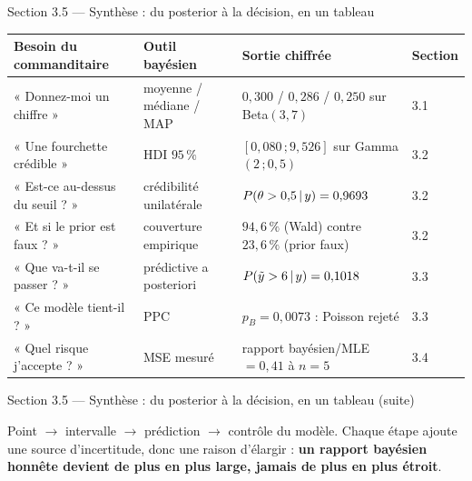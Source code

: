 \begin{frame}{Section 3.5 --- Synthèse : du posterior à la décision, en un tableau}
\begin{center}
\small
\begin{tabular}{@{}p{3.3cm}p{3.4cm}p{4.4cm}p{3.2cm}@{}}
\toprule
\textbf{Besoin du commanditaire} & \textbf{Outil bayésien} & \textbf{Sortie chiffrée} & \textbf{Section} \\
\midrule
« Donnez-moi un chiffre » & moyenne / médiane / MAP &
$0{,}300$ / $0{,}286$ / $0{,}250$ sur Beta$(3,7)$ & 3.1 \\
\addlinespace
« Une fourchette crédible » & HDI $95\,\%$ &
$[0{,}080\,;9{,}526]$ sur Gamma$(2\,;0{,}5)$ & 3.2 \\
\addlinespace
« Est-ce au-dessus du seuil ? » & crédibilité unilatérale &
$P(\theta > 0{,}5 \,\vert\, y) = 0{,}9693$ & 3.2 \\
\addlinespace
« Et si le prior est faux ? » & couverture empirique &
$94{,}6\,\%$ (Wald) contre $23{,}6\,\%$ (prior faux) & 3.2 \\
\addlinespace
« Que va-t-il se passer ? » & prédictive a posteriori &
$P(\tilde y > 6 \,\vert\, y) = 0{,}1018$ & 3.3 \\
\addlinespace
« Ce modèle tient-il ? » & PPC &
$p_B = 0{,}0073$ : Poisson rejeté & 3.3 \\
\addlinespace
« Quel risque j'accepte ? » & MSE mesuré &
rapport bayésien/MLE $= 0{,}41$ à $n=5$ & 3.4 \\
\bottomrule
\end{tabular}
\end{center}
\vspace{1.5mm}
\end{frame}

\begin{frame}{Section 3.5 --- Synthèse : du posterior à la décision, en un tableau (suite)}
\begin{kbox}
Point $\to$ intervalle $\to$ prédiction $\to$ contrôle du modèle. Chaque étape
ajoute une source d'incertitude, donc une raison d'élargir : \textbf{un rapport
bayésien honnête devient de plus en plus large, jamais de plus en plus étroit}.
\end{kbox}
\end{frame}

